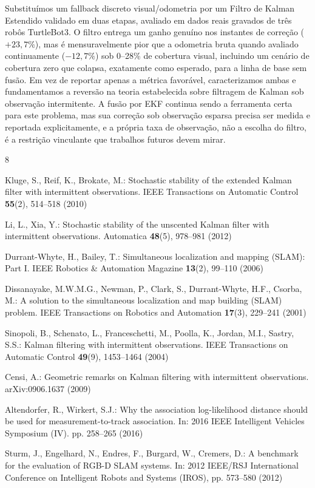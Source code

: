 \documentclass[runningheads]{llncs}
\renewcommand{\paragraph}[1]{\vspace{4pt}\noindent{\em #1}\enspace}
\begin{document}
\paragraph{Conclusão.}
Substituímos um fallback discreto visual/odometria por um Filtro de
Kalman Estendido validado em duas etapas, avaliado em dados reais
gravados de três robôs TurtleBot3. O filtro entrega um ganho genuíno
nos instantes de correção ($+23,7\%$), mas é mensuravelmente pior que
a odometria bruta quando avaliado continuamente ($-12,7\%$) sob
0--28\% de cobertura visual, incluindo um cenário de cobertura zero
que colapsa, exatamente como esperado, para a linha de base sem fusão.
Em vez de reportar apenas a métrica favorável, caracterizamos ambas e
fundamentamos a reversão na teoria estabelecida sobre filtragem de
Kalman sob observação intermitente. A fusão por EKF continua sendo a
ferramenta certa para este problema, mas sua correção sob observação
esparsa precisa ser medida e reportada explicitamente, e a própria
taxa de observação, não a escolha do filtro, é a restrição vinculante
que trabalhos futuros devem mirar.

\begin{thebibliography}{8}
\setlength{\itemsep}{0pt}
\setlength{\parskip}{2pt}

Kluge, S., Reif, K., Brokate, M.: Stochastic stability of the extended
Kalman filter with intermittent observations. IEEE Transactions on
Automatic Control \textbf{55}(2), 514--518 (2010)

Li, L., Xia, Y.: Stochastic stability of the unscented Kalman filter
with intermittent observations. Automatica \textbf{48}(5), 978--981
(2012)

Durrant-Whyte, H., Bailey, T.: Simultaneous localization and mapping
(SLAM): Part I. IEEE Robotics \& Automation Magazine \textbf{13}(2),
99--110 (2006)

Dissanayake, M.W.M.G., Newman, P., Clark, S., Durrant-Whyte, H.F.,
Csorba, M.: A solution to the simultaneous localization and map building
(SLAM) problem. IEEE Transactions on Robotics and Automation
\textbf{17}(3), 229--241 (2001)

Sinopoli, B., Schenato, L., Franceschetti, M., Poolla, K., Jordan, M.I.,
Sastry, S.S.: Kalman filtering with intermittent observations. IEEE
Transactions on Automatic Control \textbf{49}(9), 1453--1464 (2004)

Censi, A.: Geometric remarks on Kalman filtering with intermittent
observations. arXiv:0906.1637 (2009)

Altendorfer, R., Wirkert, S.J.: Why the association log-likelihood
distance should be used for measurement-to-track association. In: 2016
IEEE Intelligent Vehicles Symposium (IV). pp. 258--265 (2016)

Sturm, J., Engelhard, N., Endres, F., Burgard, W., Cremers, D.: A
benchmark for the evaluation of RGB-D SLAM systems. In: 2012 IEEE/RSJ
International Conference on Intelligent Robots and Systems (IROS),
pp. 573--580 (2012)

\end{thebibliography}
\end{document}
